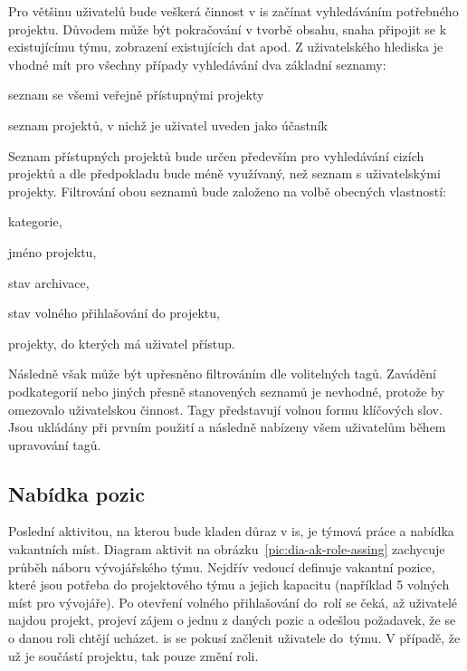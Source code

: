 Pro většinu uživatelů bude veškerá činnost v \gls{is} začínat vyhledáváním potřebného projektu. Důvodem může být pokračování v tvorbě obsahu, snaha připojit se k existujícímu týmu, zobrazení existujících dat apod. Z uživatelského hlediska je vhodné mít pro všechny případy vyhledávání dva základní seznamy:

\begin{ulnar}
   \item seznam se všemi veřejně přístupnými projekty
   \item seznam projektů, v nichž je uživatel uveden jako účastník
\end{ulnar}

Seznam přístupných projektů bude určen především pro vyhledávání cizích projektů a dle předpokladu bude méně využívaný, než seznam s uživatelskými projekty. Filtrování obou seznamů bude založeno na volbě obecných vlastností:

\begin{ulnar}
   \item kategorie,
   \item jméno projektu,
   \item stav archivace,
   \item stav volného přihlašování do projektu,
   \item projekty, do kterých má uživatel přístup.
\end{ulnar}

Následně však může být upřesněno filtrováním dle volitelných tagů. Zavádění podkategorií nebo jiných přesně stanovených seznamů je nevhodné, protože by omezovalo uživatelskou činnost. Tagy představují volnou formu klíčových slov. Jsou ukládány při prvním použití a následně nabízeny všem uživatelům během upravování tagů.





\subsection{Nabídka pozic}

Poslední aktivitou, na kterou bude kladen důraz v \gls{is}, je týmová práce a nabídka vakantních míst. Diagram aktivit na obrázku~\ref{pic:dia-ak-role-assing} zachycuje průběh náboru vývojářského týmu. Nejdřív vedoucí definuje vakantní pozice, které jsou potřeba do projektového týmu a jejich kapacitu (například 5 volných míst pro vývojáře). Po otevření volného přihlašování do~rolí se čeká, až uživatelé najdou projekt, projeví zájem o jednu z daných pozic a odešlou požadavek, že se o danou roli chtějí ucházet. \gls{is} se pokusí začlenit uživatele do~týmu. V případě, že už je součástí projektu, tak pouze změní roli.


